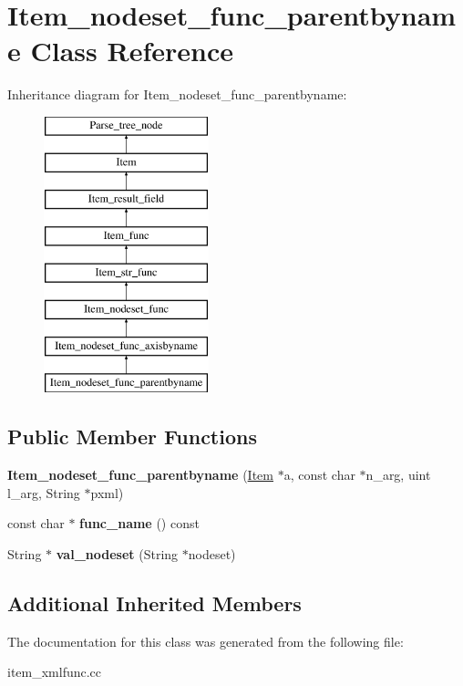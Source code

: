 \hypertarget{classItem__nodeset__func__parentbyname}{}\section{Item\+\_\+nodeset\+\_\+func\+\_\+parentbyname Class Reference}
\label{classItem__nodeset__func__parentbyname}
Inheritance diagram for Item\+\_\+nodeset\+\_\+func\+\_\+parentbyname\+:\begin{figure}[H]
\begin{center}
\leavevmode
\includegraphics[height=8.000000cm]{classItem__nodeset__func__parentbyname}
\end{center}
\end{figure}
\subsection*{Public Member Functions}
\begin{DoxyCompactItemize}
\item 
\mbox{\label{classItem__nodeset__func__parentbyname_a94a059e40a86a87136e5b0fe1db231c9}} 
{\bfseries Item\+\_\+nodeset\+\_\+func\+\_\+parentbyname} (\mbox{\hyperlink{classItem}{Item}} $\ast$a, const char $\ast$n\+\_\+arg, uint l\+\_\+arg, String $\ast$pxml)
\item 
\mbox{\label{classItem__nodeset__func__parentbyname_a447f02ec9bd86c61d06fa2655ee79bd0}} 
const char $\ast$ {\bfseries func\+\_\+name} () const
\item 
\mbox{\label{classItem__nodeset__func__parentbyname_ab56ad1d0c792cf33d51b56ba961fb94f}} 
String $\ast$ {\bfseries val\+\_\+nodeset} (String $\ast$nodeset)
\end{DoxyCompactItemize}
\subsection*{Additional Inherited Members}


The documentation for this class was generated from the following file\+:\begin{DoxyCompactItemize}
\item 
item\+\_\+xmlfunc.\+cc\end{DoxyCompactItemize}
